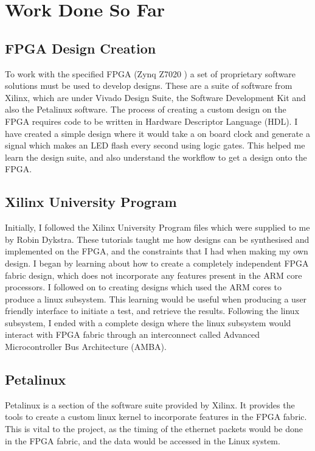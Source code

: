 \chapter{Work Done So Far}\label{C:workDoneSoFar}

\section{FPGA Design Creation}

\par To work with the specified FPGA (Zynq Z7020 \cite{fpga}) a set of proprietary software solutions must be used to develop designs.
These are a suite of software from Xilinx, which are under Vivado Design Suite, the Software Development Kit and also the Petalinux software.
The process of creating a custom design on the FPGA requires code to be written in Hardware Descriptor Language (HDL).
I have created a simple design where it would take a on board clock and generate a signal which makes an LED flash every second using logic gates.
This helped me learn the design suite, and also understand the workflow to get a design onto the FPGA.

\section{Xilinx University Program}

\par Initially, I followed the Xilinx University Program files which were supplied to me by Robin Dykstra.
These tutorials taught me how designs can be synthesised and implemented on the FPGA, and the constraints that I had when making my own design.
I began by learning about how to create a completely independent FPGA fabric design, which does not incorporate any features present in the ARM core processors.
I followed on to creating designs which used the ARM cores to produce a linux subsystem.
This learning would be useful when producing a user friendly interface to initiate a test, and retrieve the results.
Following the linux subsystem, I ended with a complete design where the linux subsystem would interact with FPGA fabric through an interconnect called Advanced Microcontroller Bus Architecture (AMBA).

\section{Petalinux}

\par Petalinux is a section of the software suite provided by Xilinx.
It provides the tools to create a custom linux kernel to incorporate features in the FPGA fabric.
This is vital to the project, as the timing of the ethernet packets would be done in the FPGA fabric, and the data would be accessed in the Linux system.

